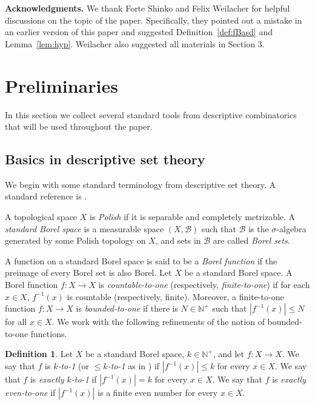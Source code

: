 \documentclass[11pt, reqno, a4paper]{amsart}
\theoremstyle{definition}
\newtheorem{definition}[theorem]{Definition}
\theoremstyle{plain}
\begin{document}
\medskip
\noindent\textbf{Acknowledgments.} We thank Forte Shinko and Felix Weilacher for helpful discussions on the topic of the paper. Specifically, they pointed out a mistake in an earlier version of this paper and suggested Definition~\ref{def:fBasd} and Lemma~\ref{lem:hyp}. Weilacher also suggested all materials in Section 3.

\section{Preliminaries}

In this section we collect several standard tools from descriptive combinatorics that will be used throughout the paper. 

\subsection{Basics in descriptive set theory}

We begin with some standard terminology from descriptive set theory. A standard reference is \cite{Kechris1995}.

A topological space $X$ is \emph{Polish} if it is separable and completely metrizable.
A \emph{standard Borel space} is a measurable space $(X,\mathcal{B})$ such that $\mathcal{B}$ is the $\sigma$-algebra generated by some Polish topology on $X$, and sets in $\mathcal{B}$ are called \emph{Borel sets}. 


A function on a standard Borel space is said to be a \emph{Borel function} if the preimage of every Borel set is also Borel.
Let $X$ be a standard Borel space. A Borel function $f\colon X\to X$ is \emph{countable-to-one} (respectively, \emph{finite-to-one}) if for each $x\in X$, $f^{-1}(x)$ is countable (respectively, finite). Moreover, a finite-to-one function $f\colon X\to X$ is \emph{bounded-to-one} if there is $N\in \mathbb{N}^+$ such that $|f^{-1}(x)|\leq N$ for all $x\in X$. We work with the following refinements of the notion of bounded-to-one functions.
\begin{definition}
   Let $X$ be a standard Borel space, $k\in \mathbb{N}^+$, and let $f: X\to X$. We say that $f$ is \emph{$k$-to-1} (or \emph{$\leq\!k$-to-1} as in \cite{KechrisSoleckiTodorcevic1999}) if $|f^{-1}(x)|\le k$ for every $x\in X$. 
   We say that $f$ is \emph{exactly $k$-to-1} if $|f^{-1}(x)|= k$ for every $x\in X$. 
   We say that $f$ is \emph{exactly even-to-one} if $|f^{-1}(x)|$ is a finite even number for every $x\in X$.
\end{definition}
\end{document}
